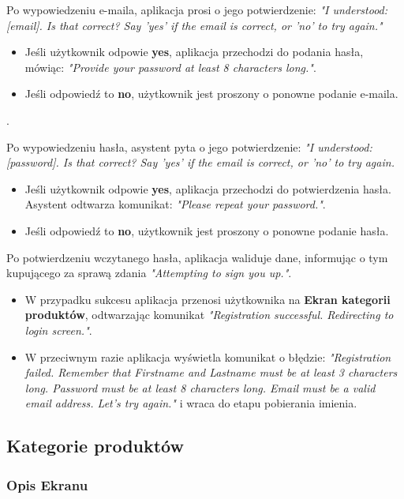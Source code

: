 Po wypowiedzeniu e-maila, aplikacja prosi o jego potwierdzenie:
\textit{"I understood: [email]. Is that correct? Say 'yes' if the email is correct, or 'no' to try again."}

\begin{itemize}
    \item Jeśli użytkownik odpowie \textbf{yes}, aplikacja przechodzi do podania hasła, mówiąc: \textit{"Provide your password at least 8 characters long."}.
    \item Jeśli odpowiedź to \textbf{no}, użytkownik jest proszony o ponowne podanie e-maila.
\end{itemize}.

Po wypowiedzeniu hasła, asystent pyta o jego potwierdzenie:
\textit{"I understood: [password]. Is that correct? Say 'yes' if the email is correct, or 'no' to try again.}
\begin{itemize}
    \item Jeśli użytkownik odpowie \textbf{yes}, aplikacja przechodzi do potwierdzenia hasła. Asystent odtwarza komunikat: \textit{"Please repeat your password."}.
    \item Jeśli odpowiedź to \textbf{no}, użytkownik jest proszony o ponowne podanie hasła.
\end{itemize}


Po potwierdzeniu wczytanego hasła, aplikacja waliduje dane, informując o tym kupującego za sprawą zdania \textit{"Attempting to sign you up."}.

\begin{itemize}
    \item W przypadku sukcesu aplikacja przenosi użytkownika na \textbf{Ekran kategorii produktów}, odtwarzając komunikat \textit{"Registration successful. Redirecting to login screen."}.
    \item W przeciwnym razie aplikacja wyświetla komunikat o błędzie: \textit{"Registration failed. Remember that Firstname and Lastname must be at least 3 characters long. Password must be at least 8 characters long. Email must be a valid email address. Let's try again."} i wraca do etapu pobierania imienia.
\end{itemize}

\subsection{Kategorie produktów}

\subsubsection{Opis Ekranu}

